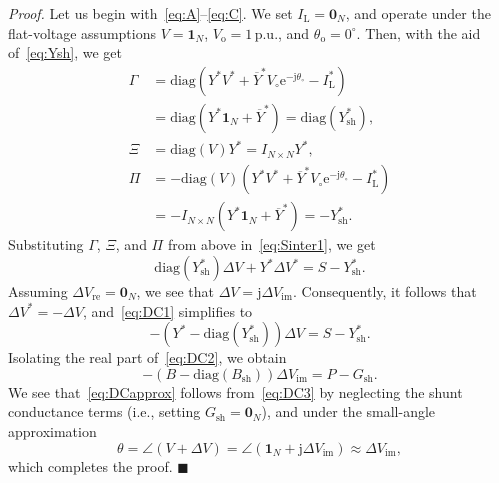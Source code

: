 \documentclass[10 pt, conference]{ieeeconf}
\newcommand{\qedblack}{\hfill \ensuremath{\blacksquare}}
\begin{document}
\noindent \emph{Proof.} Let us begin with~\eqref{eq:A}--\eqref{eq:C}. We set $I_\mathrm{L} = \mathbf{0}_N$, and operate under the flat-voltage assumptions $V = \mathbf{1}_N$, $V_\mathrm{o} = 1\,\mathrm{p.u.}$, and $\theta_\mathrm o = 0^\circ$. Then, with the aid of~\eqref{eq:Ysh}, we get
\begin{align} 
\Gamma &= \mathrm{diag}\left(Y^* V^* + \overline{Y}^* V_\circ \mathrm e^{-\mathrm j \theta_\circ} - I_\mathrm{L}^* \right) \nonumber \\
&= \mathrm{diag}\left(Y^* \mathbf{1}_N + \overline{Y}^*\right) = \mathrm{diag}(Y^*_\mathrm{sh}), \nonumber \\
\Xi &= \mathrm{diag}\left(V\right) Y^* = I_{N\times N} Y^*, \nonumber \\
\Pi &= -\mathrm{diag}\left(V\right) \left(Y^* V^*  + \overline{Y}^* V_\circ \mathrm e^{-\mathrm j \theta_\circ} - I_\mathrm{L}^*\right) \nonumber \\
&= -I_{N\times N}\left(Y^* \mathbf{1}_N + \overline{Y}^*\right) = - Y^*_\mathrm{sh}. \nonumber
\end{align}
Substituting $\Gamma$, $\Xi$, and $\Pi$ from above in~\eqref{eq:Sinter1}, we get
\begin{equation}
\mathrm{diag}\left(Y^*_\mathrm{sh} \right) \Delta V + Y^* \Delta V^* = S - Y^*_\mathrm{sh}.
\label{eq:DC1}
\end{equation}
Assuming $\Delta V_\mathrm{re} = \mathbf{0}_N$, we see that $\Delta V = \mathrm{j}\Delta V_\mathrm{im}$. Consequently, it follows that $\Delta V^* = -\Delta V$, and~\eqref{eq:DC1} simplifies to
\begin{equation}
-\left(Y^* - \mathrm{diag}\left(Y^*_\mathrm{sh} \right)\right)\Delta V = S  - Y^*_\mathrm{sh}.
\label{eq:DC2}
\end{equation}
Isolating the real part of~\eqref{eq:DC2}, we obtain
\begin{equation}
-\left(B - \mathrm{diag}(B_\mathrm{sh}) \right) \Delta V_\mathrm{im} = P - G_\mathrm{sh}.
\label{eq:DC3}
\end{equation}
We see that~\eqref{eq:DCapprox} follows from~\eqref{eq:DC3} by neglecting the shunt conductance terms (i.e., setting $G_\mathrm{sh} = \mathbf{0}_N$), and under the small-angle approximation
\begin{equation}
\theta = \angle(V + \Delta V) = \angle(\mathbf{1}_N + \mathrm j \Delta V_\mathrm{im}) \approx \Delta V_\mathrm {im},
\end{equation}
which completes the proof. \qedblack
\end{document}

